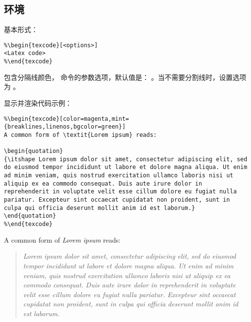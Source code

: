 \subsection{\protect{} 环境}

基本形式：

\begin{verbatim}
%\begin{texcode}[<options>]
<Latex code>
%\end{texcode}
\end{verbatim}

 包含分隔线颜色， 命令的参数选项，默认值是：
\verbum{[color=teal, mint=\{\}]}。当不需要分割线时，设置选项为 \verbum{[color=\{\}]}。

显示并渲染代码示例：

\begin{verbatim}
%\begin{texcode}[color=magenta,mint={breaklines,linenos,bgcolor=green}]
A common form of \textit{Lorem ipsum} reads:

\begin{quotation}
{\itshape Lorem ipsum dolor sit amet, consectetur adipiscing elit, sed do eiusmod tempor incididunt ut labore et dolore magna aliqua. Ut enim ad minim veniam, quis nostrud exercitation ullamco laboris nisi ut aliquip ex ea commodo consequat. Duis aute irure dolor in reprehenderit in voluptate velit esse cillum dolore eu fugiat nulla pariatur. Excepteur sint occaecat cupidatat non proident, sunt in culpa qui officia deserunt mollit anim id est laborum.}
\end{quotation}
%\end{texcode}
\end{verbatim}

A common form of \textit{Lorem ipsum} reads:

\begin{quotation}
{\itshape Lorem ipsum dolor sit amet, consectetur adipiscing elit, sed do eiusmod tempor incididunt ut labore et dolore magna aliqua. Ut enim ad minim veniam, quis nostrud exercitation ullamco laboris nisi ut aliquip ex ea commodo consequat. Duis aute irure dolor in reprehenderit in voluptate velit esse cillum dolore eu fugiat nulla pariatur. Excepteur sint occaecat cupidatat non proident, sunt in culpa qui officia deserunt mollit anim id est laborum.}
\end{quotation}


